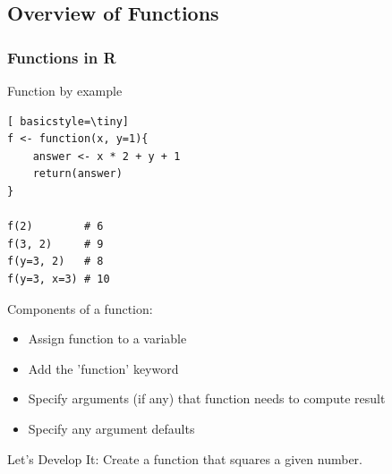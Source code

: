 \subsection{Overview of Functions}
\begin{frame}[fragile]
	\frametitle{Functions in R}
	\vspace{-15pt}
	\begin{center}
		\begin{block}{Function by example}
			\begin{lstlisting}[ basicstyle=\tiny]
f <- function(x, y=1){
	answer <- x * 2 + y + 1
	return(answer)
}

f(2)        # 6
f(3, 2)     # 9
f(y=3, 2)   # 8
f(y=3, x=3) # 10
			\end{lstlisting}	
		\end{block}

		\vspace{-5pt}
		\begin{block}{Components of a function:}
			\begin{itemize}
				\item Assign function to a variable
				\item Add the 'function' keyword
				\item Specify arguments (if any) that function needs to compute result
				\item Specify any argument defaults
			\end{itemize}
		\end{block}
	\end{center} 
\end{frame}

\begin{frame}
	\begin{alertblock}{Let's Develop It:}
		Create a function that squares a given number.
	\end{alertblock}
\end{frame}

